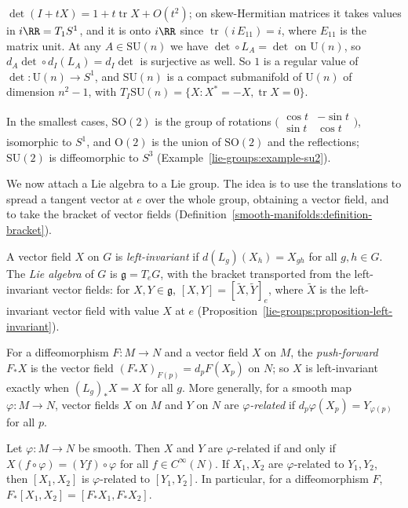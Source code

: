 \begin{example}
\begin{enumerate}
$\det(I + tX) = 1 + t\operatorname{tr}X + O(t^2)$; on skew-Hermitian matrices it takes values in $i\RR = T_1S^1$, and it is onto $i\RR$ since
$\operatorname{tr}(i\,E_{11}) = i$, where $E_{11}$ is the matrix unit. At any $A \in \mathrm{SU}(n)$ we have $\det \circ L_A = \det$ on $\mathrm{U}(n)$, so
$d_A\det \circ d_I(L_A) = d_I\det$ is surjective as well. So $1$ is a regular value of $\det \colon \mathrm{U}(n) \to S^1$, and $\mathrm{SU}(n)$ is a compact
submanifold of $\mathrm{U}(n)$ of dimension $n^2 - 1$, with $T_I\mathrm{SU}(n) = \{X : X^* = -X, \operatorname{tr}X = 0\}$.
\end{enumerate}
In the smallest cases, $\mathrm{SO}(2)$ is the group of rotations
$\bigl(\begin{smallmatrix}\cos t & -\sin t\\ \sin t & \cos t\end{smallmatrix}\bigr)$, isomorphic to $S^1$, and $\mathrm{O}(2)$ is the union of $\mathrm{SO}(2)$
and the reflections; $\mathrm{SU}(2)$ is diffeomorphic to $S^3$ (Example~\ref{lie-groups:example-su2}).
\end{example}

We now attach a Lie algebra to a Lie group. The idea is to use the translations to spread a tangent vector at $e$ over the whole group, obtaining a vector field,
and to take the bracket of vector fields (Definition~\ref{smooth-manifolds:definition-bracket}).

\begin{definition}\label{lie-groups:definition-lie-algebra-of-g}
A vector field $X$ on $G$ is \emph{left-invariant} if $d(L_g)(X_h) = X_{gh}$ for all $g, h \in G$. The \emph{Lie algebra} of $G$ is $\mathfrak{g} = T_eG$, with
the bracket transported from the left-invariant vector fields: for $X, Y \in \mathfrak{g}$, $[X, Y] = [\widetilde{X}, \widetilde{Y}]_e$, where
$\widetilde{X}$ is the left-invariant vector field with value $X$ at $e$ (Proposition~\ref{lie-groups:proposition-left-invariant}).
\end{definition}

For a diffeomorphism $F \colon M \to N$ and a vector field $X$ on $M$, the \emph{push-forward} $F_*X$ is the vector field $(F_*X)_{F(p)} = d_pF(X_p)$ on $N$;
so $X$ is left-invariant exactly when $(L_g)_*X = X$ for all $g$. More generally, for a smooth map $\varphi \colon M \to N$, vector fields $X$ on $M$ and $Y$ on
$N$ are \emph{$\varphi$-related} if $d_p\varphi(X_p) = Y_{\varphi(p)}$ for all $p$.

\begin{lemma}\label{lie-groups:lemma-related-fields}
Let $\varphi \colon M \to N$ be smooth. Then $X$ and $Y$ are $\varphi$-related if and only if $X(f \circ \varphi) = (Yf) \circ \varphi$ for all $f \in C^\infty(N)$. If
$X_1, X_2$ are $\varphi$-related to $Y_1, Y_2$, then $[X_1, X_2]$ is $\varphi$-related to $[Y_1, Y_2]$. In particular, for a diffeomorphism $F$,
$F_*[X_1, X_2] = [F_*X_1, F_*X_2]$.
\end{lemma}

